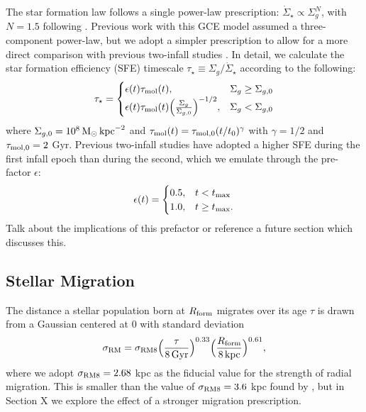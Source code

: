 \documentclass[twocolumn,twocolappendix,linenumbers]{aastex631}
\newcommand{\todo}[1]{{\color{red}#1}}
\begin{document}
The star formation law follows a single power-law prescription: $\dot\Sigma_\star\propto\Sigma_g^N$, with $N=1.5$ following \citet{kennicutt_global_1998}. Previous work with this GCE model \citep[e.g.,][]{johnson_stellar_2021,dubay_galactic_2024} assumed a three-component power-law, but we adopt a simpler prescription to allow for a more direct comparison with previous two-infall studies \citep[e.g.,][]{spitoni_remind_2024}. In detail, we calculate the star formation efficiency (SFE) timescale $\tau_\star\equiv\Sigma_g/\dot\Sigma_\star$ according to the following:
\begin{equation}
    \label{eq:sf-law}
    \tau_\star = 
    \begin{cases}
        \epsilon(t) \tau_{\rm mol}(t),   & \Sigma_g \ge \Sigma_{g,0} \\
        \epsilon(t) \tau_{\rm mol}(t) \Big(\frac{\Sigma_g}{\Sigma_{g,0}}\Big)^{-1/2}, & \Sigma_g < \Sigma_{g,0}
    \end{cases}
\end{equation}
where $\Sigma_{g,0} = 10^8\,{\rm M}_\odot\,{\rm kpc}^{-2}$ and $\tau_{\rm mol}(t)=\tau_{\rm mol,0}(t/t_0)^\gamma$ with $\gamma=1/2$ and $\tau_{\rm mol,0}=2$ Gyr. Previous two-infall studies \citep[e.g.,][]{nissen_high-precision_2020} have adopted a higher SFE during the first infall epoch than during the second, which we emulate through the pre-factor $\epsilon$:
\begin{equation}
    \label{eq:sfe-prefactor}
    \epsilon(t) = 
    \begin{cases}
        0.5, & t < t_{\rm max} \\
        1.0, & t \ge t_{\rm max}.
    \end{cases}
\end{equation}
\todo{Talk about the implications of this prefactor or reference a future section which discusses this.}

\subsection{Stellar Migration}
\label{sec:migration}

The distance a stellar population born at $R_{\rm form}$ migrates over its age $\tau$ is drawn from a Gaussian centered at 0 with standard deviation
\begin{equation}
    \sigma_{\rm RM} = \sigma_{\rm RM8} \Big(\frac{\tau}{8\,{\rm Gyr}}\Big)^{0.33} \Big(\frac{R_{\rm form}}{8\,{\rm kpc}}\Big)^{0.61},
    \label{eq:radial-migration}
\end{equation}
where we adopt $\sigma_{\rm RM8}=2.68$ kpc as the fiducial value for the strength of radial migration. This is smaller than the value of $\sigma_{\rm RM8}=3.6$ kpc found by \citet{frankel_measuring_2018}, but in \todo{Section X} we explore the effect of a stronger migration prescription.
\end{document}

